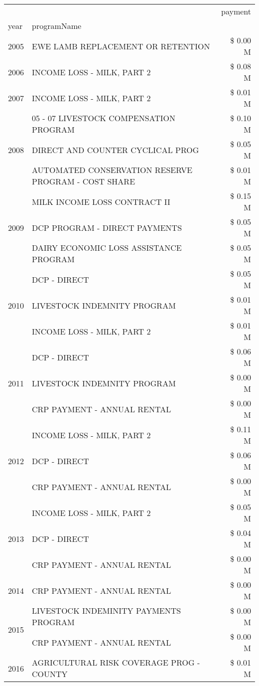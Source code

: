 \begin{tabular}{llr}
\toprule
 &  & payment \\
year & programName &  \\
\midrule
2005 & EWE LAMB REPLACEMENT OR RETENTION & \$ 0.00 M \\
\cline{1-3}
2006 & INCOME LOSS - MILK, PART 2 & \$ 0.08 M \\
\cline{1-3}
2007 & INCOME LOSS - MILK, PART 2 & \$ 0.01 M \\
\cline{1-3}
\multirow[t]{3}{*}{2008} & 05 - 07 LIVESTOCK COMPENSATION PROGRAM & \$ 0.10 M \\
 & DIRECT AND COUNTER CYCLICAL PROG & \$ 0.05 M \\
 & AUTOMATED CONSERVATION RESERVE PROGRAM - COST SHARE & \$ 0.01 M \\
\cline{1-3}
\multirow[t]{3}{*}{2009} & MILK INCOME LOSS CONTRACT II & \$ 0.15 M \\
 & DCP PROGRAM - DIRECT PAYMENTS & \$ 0.05 M \\
 & DAIRY ECONOMIC LOSS ASSISTANCE PROGRAM & \$ 0.05 M \\
\cline{1-3}
\multirow[t]{3}{*}{2010} & DCP - DIRECT & \$ 0.05 M \\
 & LIVESTOCK INDEMNITY PROGRAM & \$ 0.01 M \\
 & INCOME LOSS - MILK, PART 2 & \$ 0.01 M \\
\cline{1-3}
\multirow[t]{3}{*}{2011} & DCP - DIRECT & \$ 0.06 M \\
 & LIVESTOCK INDEMNITY PROGRAM & \$ 0.00 M \\
 & CRP PAYMENT - ANNUAL RENTAL & \$ 0.00 M \\
\cline{1-3}
\multirow[t]{3}{*}{2012} & INCOME LOSS - MILK, PART 2 & \$ 0.11 M \\
 & DCP - DIRECT & \$ 0.06 M \\
 & CRP PAYMENT - ANNUAL RENTAL & \$ 0.00 M \\
\cline{1-3}
\multirow[t]{3}{*}{2013} & INCOME LOSS - MILK, PART 2 & \$ 0.05 M \\
 & DCP - DIRECT & \$ 0.04 M \\
 & CRP PAYMENT - ANNUAL RENTAL & \$ 0.00 M \\
\cline{1-3}
2014 & CRP PAYMENT - ANNUAL RENTAL & \$ 0.00 M \\
\cline{1-3}
\multirow[t]{2}{*}{2015} & LIVESTOCK INDEMINITY PAYMENTS PROGRAM & \$ 0.00 M \\
 & CRP PAYMENT - ANNUAL RENTAL & \$ 0.00 M \\
\cline{1-3}
\multirow[t]{3}{*}{2016} & AGRICULTURAL RISK COVERAGE PROG - COUNTY & \$ 0.01 M \\

\end{tabular}
